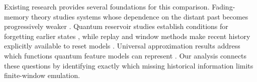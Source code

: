 Existing research provides several foundations for this comparison.
Fading-memory theory studies systems whose dependence on the distant past
becomes progressively weaker \cite{boyd1985fading,grigoryeva2018sas}.
Quantum reservoir studies establish conditions for forgetting earlier states
\cite{martinezpena2023finite,sannia2024dissipation}, while replay and window methods make recent
history explicitly available to reset models
\cite{mujal2023measurement,cindrak2024restriction,kawanabe2026tdqelm}. Universal approximation
results address which functions quantum feature models can represent
\cite{goto2021universal,yu2024nonasymptotic}. Our analysis connects these
questions by identifying exactly which missing historical information limits
finite-window emulation.
